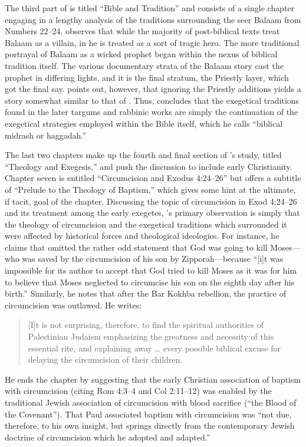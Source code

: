 The third part of  is titled ``Bible and Tradition'' and consists of a single chapter engaging in a lengthy analysis of the traditions surrounding the seer Balaam from Numbers 22--24. \vermes observes that while the majority of post-biblical texts treat Balaam as a villain, in \lab he is treated as a sort of tragic hero.%
    \autocite[173]{vermes1961}
The more traditional portrayal of Balaam as a wicked prophet began within the nexus of biblical tradition itself. The various documentary strata of the Balaam story cast the prophet in differing lights, and it is the final stratum, the Priestly layer, which got the final say.
%
%
\vermes points out, however, that ignoring the Priestly additions yields a story somewhat similar to that of \lab. Thus, \vermes concludes that the exegetical traditions found in the later targums and rabbinic works are simply the continuation of the exegetical strategies employed within the Bible itself, which he calls ``biblical midrash or haggadah.''%
    \autocite[176]{vermes1961}

The last two chapters make up the fourth and final section of \vermes's study, titled ``Theology and Exegesis,'' and push the discussion to include early Christianity. Chapter seven is entitled ``Circumcision and Exodus 4:24--26'' but offers a subtitle of ``Prelude to the Theology of Baptism,'' which gives some hint at the ultimate, if tacit, goal of the chapter. Discussing the topic of circumcision in Exod 4:24--26 and its treatment among the early exegetes, \vermes's primary observation is simply that the theology of circumcision and the exegetical traditions which surrounded it were affected by historical forces and theological ideologies. For instance, he claims that \jub omitted the rather odd statement that God was going to kill Moses---who was saved by the circumcision of his son by Zipporah---because ``[i]t was impossible for its author to accept that God tried to kill Moses as it was for him to believe that Moses neglected to circumcise his son on the eighth day after his birth.''%
    \autocite[185]{vermes1961}
Similarly, he notes that after the Bar Kokhba rebellion, the practice of circumcision was outlawed. He writes:
\begin{quote}
    [I]t is not surprising, therefore, to find the spiritual authorities of Palestinian Judaism emphasizing the greatness and necessity of this essential rite, and explaining away \ldots{} every possible biblical excuse for delaying the circumcision of their children.%
        \autocite[189]{vermes1961}
\end{quote}
\noindent
He ends the chapter by suggesting that the early Christian association of baptism with circumcision (citing Rom 4:3--4 and Col 2:11--12) was enabled by the traditional Jewish association of circumcision with blood sacrifice (``the Blood of the Covenant'').%
    \autocite[190]{vermes1961}
That Paul associated baptism with circumcision was ``not due, therefore, to his own insight, but springs directly from the contemporary Jewish doctrine of circumcision which he adopted and adapted.''%
    \autocite[191]{vermes1961} 


